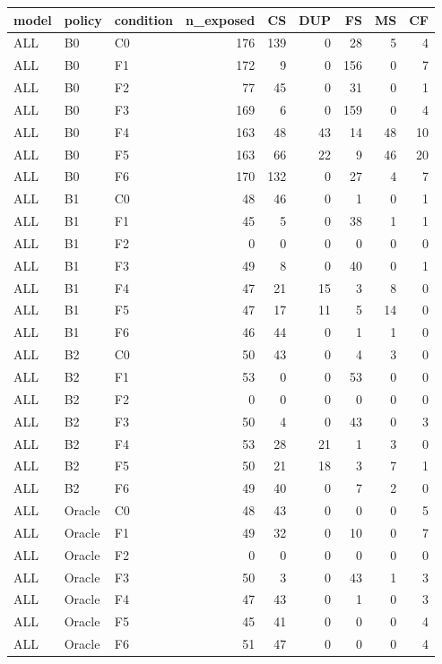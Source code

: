 \begin{tabular}{lllrrrrrr}
\toprule
model & policy & condition & n\_exposed & CS & DUP & FS & MS & CF \\
\midrule
ALL & B0 & C0 & 176 & 139 & 0 & 28 & 5 & 4 \\
ALL & B0 & F1 & 172 & 9 & 0 & 156 & 0 & 7 \\
ALL & B0 & F2 & 77 & 45 & 0 & 31 & 0 & 1 \\
ALL & B0 & F3 & 169 & 6 & 0 & 159 & 0 & 4 \\
ALL & B0 & F4 & 163 & 48 & 43 & 14 & 48 & 10 \\
ALL & B0 & F5 & 163 & 66 & 22 & 9 & 46 & 20 \\
ALL & B0 & F6 & 170 & 132 & 0 & 27 & 4 & 7 \\
ALL & B1 & C0 & 48 & 46 & 0 & 1 & 0 & 1 \\
ALL & B1 & F1 & 45 & 5 & 0 & 38 & 1 & 1 \\
ALL & B1 & F2 & 0 & 0 & 0 & 0 & 0 & 0 \\
ALL & B1 & F3 & 49 & 8 & 0 & 40 & 0 & 1 \\
ALL & B1 & F4 & 47 & 21 & 15 & 3 & 8 & 0 \\
ALL & B1 & F5 & 47 & 17 & 11 & 5 & 14 & 0 \\
ALL & B1 & F6 & 46 & 44 & 0 & 1 & 1 & 0 \\
ALL & B2 & C0 & 50 & 43 & 0 & 4 & 3 & 0 \\
ALL & B2 & F1 & 53 & 0 & 0 & 53 & 0 & 0 \\
ALL & B2 & F2 & 0 & 0 & 0 & 0 & 0 & 0 \\
ALL & B2 & F3 & 50 & 4 & 0 & 43 & 0 & 3 \\
ALL & B2 & F4 & 53 & 28 & 21 & 1 & 3 & 0 \\
ALL & B2 & F5 & 50 & 21 & 18 & 3 & 7 & 1 \\
ALL & B2 & F6 & 49 & 40 & 0 & 7 & 2 & 0 \\
ALL & Oracle & C0 & 48 & 43 & 0 & 0 & 0 & 5 \\
ALL & Oracle & F1 & 49 & 32 & 0 & 10 & 0 & 7 \\
ALL & Oracle & F2 & 0 & 0 & 0 & 0 & 0 & 0 \\
ALL & Oracle & F3 & 50 & 3 & 0 & 43 & 1 & 3 \\
ALL & Oracle & F4 & 47 & 43 & 0 & 1 & 0 & 3 \\
ALL & Oracle & F5 & 45 & 41 & 0 & 0 & 0 & 4 \\
ALL & Oracle & F6 & 51 & 47 & 0 & 0 & 0 & 4 \\

\end{tabular}
